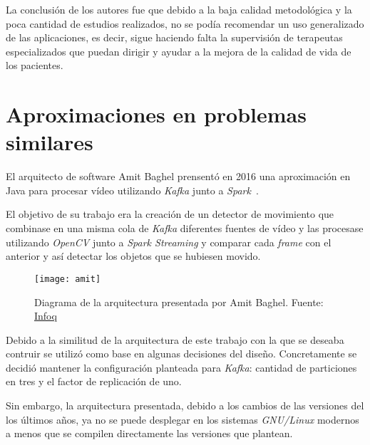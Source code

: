 La conclusión de los autores fue que debido a la baja calidad metodológica y la poca cantidad de estudios realizados, no se podía recomendar un uso generalizado de las aplicaciones, es decir, sigue haciendo falta la supervisión de terapeutas especializados que puedan dirigir y ayudar a la mejora de la calidad de vida de los pacientes.

\section{Aproximaciones en problemas similares}

El arquitecto de software Amit Baghel prensentó en 2016 una aproximación en Java para procesar vídeo utilizando \textit{Kafka} junto a \textit{Spark}~\cite{amit2017kafka}.

El objetivo de su trabajo era la creación de un detector de movimiento que combinase en una misma cola de \textit{Kafka} diferentes fuentes de vídeo y las procesase utilizando \textit{OpenCV} junto a \textit{Spark Streaming} y comparar cada \textit{frame} con el anterior y así detectar los objetos que se hubiesen movido.

\begin{figure}[h]
	\centering
	\texttt{[image: amit]}
	\caption[Diagrama de la arquitectura presentada por Amit Baghel.]{Diagrama de la arquitectura presentada por Amit Baghel. Fuente: \href{https://www.infoq.com/articles/video-stream-analytics-opencv/}{Infoq}}
\end{figure}

Debido a la similitud de la arquitectura de este trabajo con la que se deseaba contruir se utilizó como base en algunas decisiones del diseño. Concretamente se decidió mantener la configuración planteada para \textit{Kafka}: cantidad de particiones  en tres y el factor de replicación de uno.

Sin embargo, la arquitectura presentada, debido a los cambios de las versiones del los últimos años, ya no se puede desplegar en los sistemas \textit{GNU/Linux} modernos a menos que se compilen directamente las versiones que plantean.